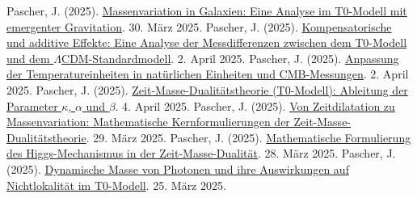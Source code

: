 \documentclass[a4paper,12pt]{article}
\theoremstyle{definition}
\theoremstyle{remark}
\begin{document}
\begin{thebibliography}{99}
	 Pascher, J. (2025). \href{https://github.com/jpascher/T0-Time-Mass-Duality/tree/main/2/pdf/Deutsch/MassVarGalaxien.pdf}{Massenvariation in Galaxien: Eine Analyse im T0-Modell mit emergenter Gravitation}. 30. März 2025.
	 Pascher, J. (2025). \href{https://github.com/jpascher/T0-Time-Mass-Duality/tree/main/2/pdf/Deutsch/MessdifferenzenT0Standard.pdf}{Kompensatorische und additive Effekte: Eine Analyse der Messdifferenzen zwischen dem T0-Modell und dem \(\Lambda\)CDM-Standardmodell}. 2. April 2025.
	 Pascher, J. (2025). \href{https://github.com/jpascher/T0-Time-Mass-Duality/tree/main/2/pdf/Deutsch/NatEinheitenAlpha1.pdf}{Anpassung der Temperatureinheiten in natürlichen Einheiten und CMB-Messungen}. 2. April 2025.
	 Pascher, J. (2025). \href{https://github.com/jpascher/T0-Time-Mass-Duality/tree/main/2/pdf/Deutsch/ZeitMasseT0Params.pdf}{Zeit-Masse-Dualitätstheorie (T0-Modell): Ableitung der Parameter \(\kappa\), \(\alpha\) und \(\beta\)}. 4. April 2025.
	 Pascher, J. (2025). \href{https://github.com/jpascher/T0-Time-Mass-Duality/tree/main/2/pdf/Deutsch/MathZeitMasseLagrange.pdf}{Von Zeitdilatation zu Massenvariation: Mathematische Kernformulierungen der Zeit-Masse-Dualitätstheorie}. 29. März 2025.
	 Pascher, J. (2025). \href{https://github.com/jpascher/T0-Time-Mass-Duality/tree/main/2/pdf/Deutsch/MathHiggsZeitMasse.pdf}{Mathematische Formulierung des Higgs-Mechanismus in der Zeit-Masse-Dualität}. 28. März 2025.
	 Pascher, J. (2025). \href{https://github.com/jpascher/T0-Time-Mass-Duality/tree/main/2/pdf/Deutsch/DynMassePhotonenNichtlokal.pdf}{Dynamische Masse von Photonen und ihre Auswirkungen auf Nichtlokalität im T0-Modell}. 25. März 2025.
\end{thebibliography}
\end{document}
